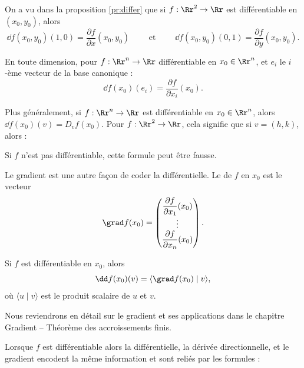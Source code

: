 \bigskip
{}

On a vu dans la proposition \ref{pr:differ} que si $f : \Rr^2 \to \Rr$ est différentiable en $(x_0,y_0)$, alors
$$\dd f (x_0,y_0) (1,0) = \frac{\partial f}{\partial x}(x_0,y_0)
\qquad \text{ et } \qquad
\dd f (x_0,y_0) (0,1) = \frac{\partial f}{\partial y}(x_0,y_0).$$

En toute dimension, pour $f : \Rr^n \to \Rr$ différentiable en $x_0 \in \Rr^n$, et $e_i$ le $i$-ème vecteur de la base canonique :
$$\dd f (x_0) (e_i) = \frac{\partial f}{\partial x_i}(x_0).$$



\bigskip
{}

Plus généralement, si $f : \Rr^n \to \Rr$ est différentiable en $x_0 \in \Rr^n$, alors $\dd f (x_0) (v) = D_v f(x_0)$.
Pour $f : \Rr^2 \to \Rr$, cela signifie que si $v=(h,k)$, alors :

Si $f$ n'est pas différentiable, cette formule peut être fausse.

\bigskip
{}

Le gradient est une autre façon de coder la différentielle.
Le  de $f$ en $x_0$ est le vecteur
$$\grad f (x_0) =
\begin{pmatrix}
	\dfrac{\partial f}{\partial x_{1}} (x_0)\\
	\vdots \\
	\dfrac{\partial f}{\partial x_n}(x_0)
\end{pmatrix}.$$

Si $f$ est différentiable en $x_0$, alors
$$\dd f (x_0) (v) = \langle \grad f (x_0) \mid v \rangle,$$
où $\langle u \mid v \rangle$ est le produit scalaire de $u$ et $v$.

Nous reviendrons en détail sur le gradient et ses applications dans le chapitre \og{}Gradient -- Théorème des accroissements finis\fg{}.


\bigskip
{}

Lorsque $f$ est différentiable alors la différentielle, la dérivée directionnelle, et le gradient encodent la même information et sont reliés  
par les formules :



